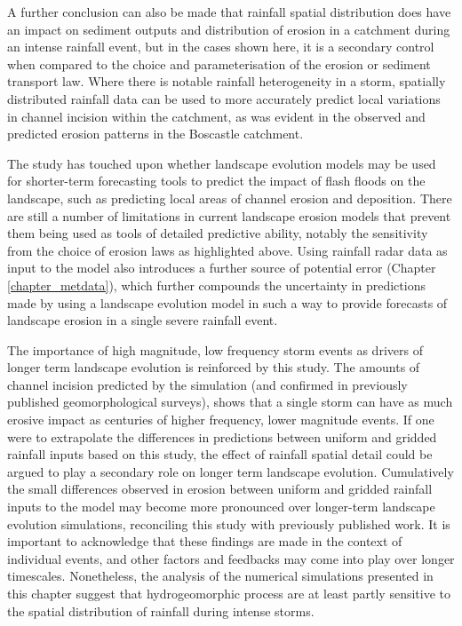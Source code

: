 A further conclusion can also be made that rainfall spatial distribution does have an impact on sediment outputs and distribution of erosion in a catchment during an intense rainfall event, but in the cases shown here, it is a secondary control when compared to the choice and parameterisation of the erosion or sediment transport law. Where there is notable rainfall heterogeneity in a storm, spatially distributed rainfall data can be used to more accurately predict local variations in channel incision within the catchment, as was evident in the observed and predicted erosion patterns in the Boscastle catchment.

The study has touched upon whether landscape evolution models may be used for shorter-term forecasting tools to predict the impact of flash floods on the landscape, such as predicting local areas of channel erosion and deposition. There are still a number of limitations in current landscape erosion models that prevent them being used as tools of detailed predictive ability, notably the sensitivity from the choice of erosion laws as highlighted above. Using rainfall radar data as input to the model also introduces a further source of potential error (Chapter \ref{chapter_metdata}), which further compounds the uncertainty in predictions made by using a landscape evolution model in such a way to provide forecasts of landscape erosion in a single severe rainfall event. 

The importance of high magnitude, low frequency storm events as drivers of longer term landscape evolution is reinforced by this study. The amounts of channel incision predicted by the simulation (and confirmed in previously published geomorphological surveys), shows that a single storm can have as much erosive impact as centuries of higher frequency, lower magnitude events. If one were to extrapolate the differences in predictions between uniform and gridded rainfall inputs based on this study, the effect of rainfall spatial detail could be argued to play a secondary role on longer term landscape evolution. Cumulatively the small differences observed in erosion between uniform and gridded rainfall inputs to the model may become more pronounced over longer-term landscape evolution simulations, reconciling this study with previously published work. It is important to acknowledge that these findings are made in the context of individual events, and other factors and feedbacks may come into play over longer timescales. Nonetheless, the analysis of the numerical simulations presented in this chapter suggest that hydrogeomorphic process are at least partly sensitive to the spatial distribution of rainfall during intense storms.









